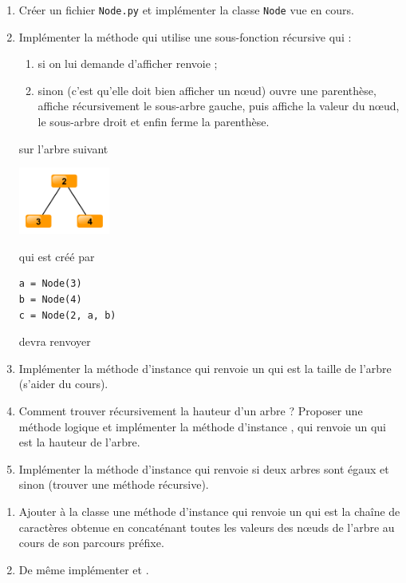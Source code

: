 \documentclass[a4paper,12pt,french]{article}
\begin{document}
\begin{exercice}
    \begin{enumerate}[\bfseries 1.]
        \item Créer un fichier \texttt{Node.py} et implémenter la classe \texttt{Node} vue en cours.
        \item Implémenter la méthode  qui  utilise une sous-fonction récursive  qui :
        \begin{enumerate}[--]
            \item si on lui demande d'afficher  renvoie ;
            \item sinon (c'est qu'elle doit bien afficher un n\oe ud)  ouvre une parenthèse, affiche récursivement le sous-arbre gauche, puis  affiche la valeur du n\oe ud, le sous-arbre droit et enfin ferme la parenthèse.\\
        \end{enumerate}
                      sur l'arbre suivant
    \begin{center}
        \includegraphics[width=3cm]{img/arbre1.png}
    \end{center}
    qui est créé par
\begin{verbatim}
a = Node(3)
b = Node(4)
c = Node(2, a, b)
\end{verbatim}
     devra renvoyer 
\item Implémenter la méthode d'instance  qui renvoie un  qui est la taille de l'arbre (s'aider du cours).
\item Comment trouver récursivement la hauteur d'un arbre ? Proposer une \og méthode logique\fg{} et implémenter la méthode d'instance , qui renvoie un  qui est la hauteur de l'arbre.
\item Implémenter la méthode d'instance  qui renvoie  si deux arbres sont égaux et  sinon (trouver une méthode récursive).
    \end{enumerate}
\end{exercice}
\begin{exercice}[: Parcours]
\begin{enumerate}[\bfseries 1.]
    \item Ajouter à la classe  une méthode d'instance  qui renvoie un  qui est la chaîne de caractères obtenue en concaténant toutes les valeurs des n\oe uds de l'arbre au cours de son parcours préfixe.
    \item De même implémenter  et .
\end{enumerate}
\end{exercice}
\end{document}
